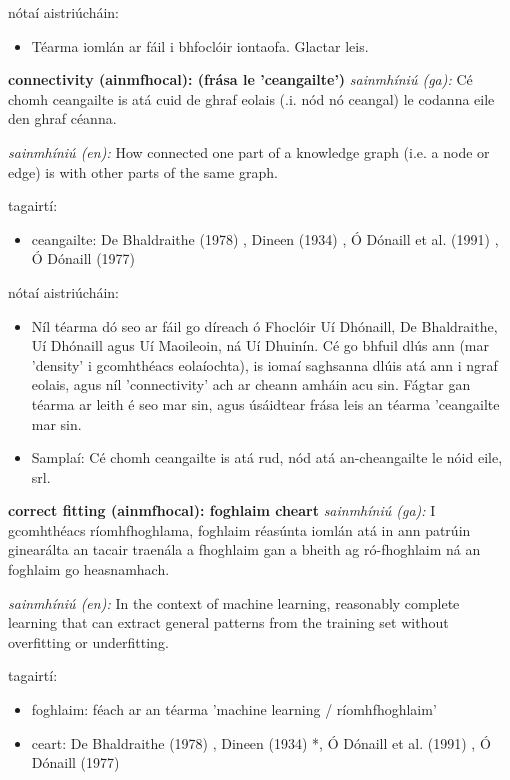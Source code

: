 \documentclass{article}
\begin{document}
nótaí aistriúcháin:
\begin{itemize}
	\item Téarma iomlán ar fáil i bhfoclóir iontaofa. Glactar leis.
\end{itemize}


\textbf{connectivity (ainmfhocal): (frása le 'ceangailte')}
\textit{sainmhíniú (ga):} Cé chomh ceangailte is atá cuid de ghraf eolais (.i. nód nó ceangal) le codanna eile den ghraf céanna.

\textit{sainmhíniú (en):} How connected one part of a knowledge graph (i.e. a node or edge) is with other parts of the same graph.

tagairtí:
\begin{itemize}
	\item ceangailte: De Bhaldraithe (1978) \cite{de-bhaldraithe}, Dineen (1934) \cite{dineen}, Ó Dónaill et al. (1991) \cite{focloir-beag}, Ó Dónaill (1977) \cite{odonaill}
\end{itemize}

nótaí aistriúcháin:
\begin{itemize}
	\item Níl téarma dó seo ar fáil go díreach ó Fhoclóir Uí Dhónaill, De Bhaldraithe, Uí Dhónaill agus Uí Maoileoin, ná Uí Dhuinín. Cé go bhfuil dlús ann (mar 'density' i gcomhthéacs eolaíochta), is iomaí saghsanna dlúis atá ann i ngraf eolais, agus níl 'connectivity' ach ar cheann amháin acu sin. Fágtar gan téarma ar leith é seo mar sin, agus úsáidtear frása leis an téarma 'ceangailte mar sin.
	\item Samplaí: Cé chomh ceangailte is atá rud, nód atá an-cheangailte le nóid eile, srl.
\end{itemize}


\textbf{correct fitting (ainmfhocal): foghlaim cheart}
\textit{sainmhíniú (ga):} I gcomhthéacs ríomhfhoghlama, foghlaim réasúnta iomlán atá in ann patrúin ginearálta an tacair traenála a fhoghlaim gan a bheith ag ró-fhoghlaim ná an foghlaim go heasnamhach.

\textit{sainmhíniú (en):} In the context of machine learning, reasonably complete learning that can extract general patterns from the training set without overfitting or underfitting.

tagairtí:
\begin{itemize}
	\item foghlaim: féach ar an téarma 'machine learning / ríomhfhoghlaim'
	\item ceart: De Bhaldraithe (1978) \cite{de-bhaldraithe}, Dineen (1934) \cite{dineen}*, Ó Dónaill et al. (1991) \cite{focloir-beag}, Ó Dónaill (1977) \cite{odonaill}
\end{itemize}
\end{document}
